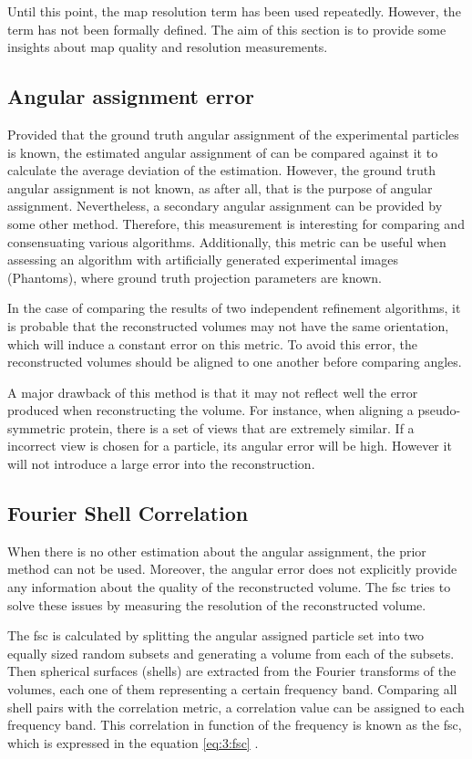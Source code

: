 \documentclass[../main.tex]{subfiles}
\begin{document}
Until this point, the map resolution term has been used repeatedly. However, the term has not been formally defined. The aim of this section is to provide some insights about map quality and resolution measurements.

\subsection{Angular assignment error}
Provided that the ground truth angular assignment of the experimental particles is known, the estimated angular assignment of can be compared against it to calculate the average deviation of the estimation. However, the ground truth angular assignment is not known, as after all, that is the purpose of angular assignment. Nevertheless, a secondary angular assignment can be provided by some other method. Therefore, this measurement is interesting for comparing and consensuating various algorithms. Additionally, this metric can be useful when assessing an algorithm with artificially generated experimental images (Phantoms), where ground truth projection parameters are known.

In the case of comparing the results of two independent refinement algorithms, it is probable that the reconstructed volumes may not have the same orientation, which will induce a constant error on this metric. To avoid this error, the reconstructed volumes should be aligned to one another before comparing angles.

A major drawback of this method is that it may not reflect well the error produced when reconstructing the volume. For instance, when aligning a pseudo-symmetric protein, there is a set of views that are extremely similar. If a incorrect view is chosen for a particle, its angular error will be high. However it will not introduce a large error into the reconstruction.

\subsection{Fourier Shell Correlation}
When there is no other estimation about the angular assignment, the prior method can not be used. Moreover, the angular error does not explicitly provide any information about the quality of the reconstructed volume. The \gls{fsc} tries to solve these issues by measuring the resolution of the reconstructed volume\cite{sorzano2017a}.

The \gls{fsc} is calculated by splitting the angular assigned particle set into two equally sized random subsets and generating a volume from each of the subsets. Then spherical surfaces (shells) are extracted from the Fourier transforms of the volumes, each one of them representing a certain frequency band. Comparing all shell pairs with the correlation metric, a correlation value can be assigned to each frequency band. This correlation in function of the frequency is known as the \gls{fsc}, which is expressed in the equation \eqref{eq:3:fsc} \cite{dubach2020}\cite{sorzano2017a}.
\end{document}
